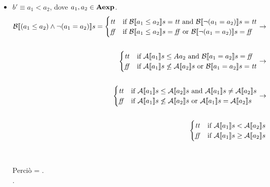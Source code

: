 {\begin{enumerate}[label=(\alph*)]
\begin{itemize}
    \item $ b' \equiv a_1 < a_2$, dove $a_1, a_2 \in \aexp$. \\
      \begin{align*}
        \B{(a_1 \leq a_2) \land \lnot(a_1 = a_2)} = 
        \begin{cases}
        \semtrue &
        \mbox{if} \ \B{a_1 \leq a_2} = \semtrue
                    \mbox{ and }
                    \B{\lnot(a_1 = a_2)} = \semtrue \\
        \semfalse &
        \mbox{if} \ \B{a_1 \leq a_2} = \semfalse
                    \mbox{ or }
                    \B{\lnot(a_1 = a_2)} = \semfalse \\
        \end{cases}
        \rightarrow \\ \\
        \begin{cases}
        \semtrue &
        \mbox{if} \ \A{a_1} \leq A{a_2}
                    \mbox{ and }
                    \B{a_1 = a_2} = \semfalse \\
        \semfalse &
        \mbox{if} \ \A{a_1} \not \leq \A{a_2}
                    \mbox{ or }
                    \B{a_1 = a_2} = \semtrue \\
        \end{cases}
        \rightarrow \\ \\
        \begin{cases}
        \semtrue &
        \mbox{if} \ \A{a_1} \leq \A{a_2}
                    \mbox{ and }
                    \A{a_1} \neq \A{a_2} \\
        \semfalse &
        \mbox{if} \ \A{a_1} \not \leq \A{a_2}
                    \mbox{ or }
                    \A{a_1} = \A{a_2} \\
        \end{cases}
        \rightarrow \\ \\
        \begin{cases}
        \semtrue &
        \mbox{if} \ \A{a_1} < \A{a_2} \\
        \semfalse &
        \mbox{if} \ \A{a_1} \geq \A{a_2} \\
        \end{cases}
      \end{align*} \\ \\
      Perciò  =
      . \\.


\end{itemize}
\end{enumerate}}
